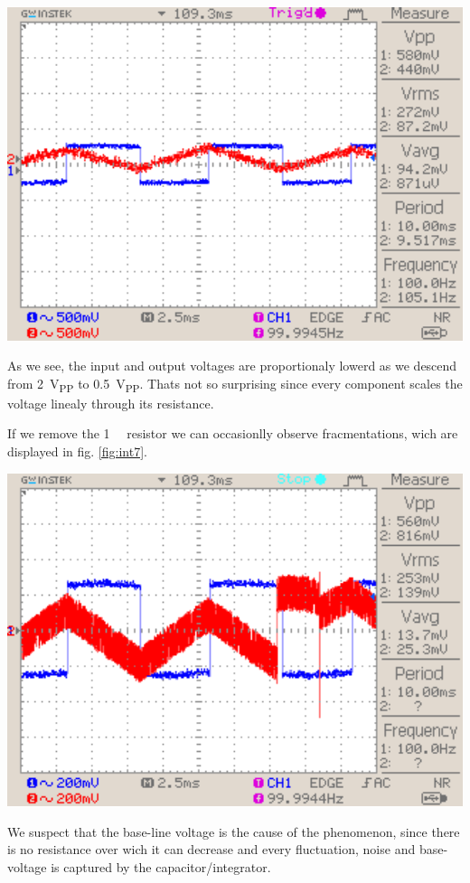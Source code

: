 \documentclass[a4paper,10pt]{article}
\newenvironment{Figure}
        {\par\medskip\noindent\minipage{\linewidth}}
        {\endminipage\par\medskip}
\numberwithin{equation}{section}
\begin{document}
\begin{multicols}{2}
\begin{Figure}
		\includegraphics[width=1\textwidth]{../data/DS0037_n.png}
		\label{fig:int6}
	\end{Figure}
  As we see, the input and output voltages are proportionaly lowerd as we descend from \SI{2}{V_{PP}} to \SI{0.5}{V_{PP}}. Thats not so surprising since every component scales the voltage linealy through its resistance.

  If we remove the \SI{1}{\mega \Omega} resistor we can occasionlly observe fracmentations, wich are displayed in fig. \ref{fig:int7}.
	\begin{Figure}
		\centering
		\includegraphics[width=1\textwidth]{../data/DS0038_n.png}
		\label{fig:int7}
	\end{Figure}
  We suspect that the base-line voltage is the cause of the phenomenon, since there is no resistance over wich it can decrease and every fluctuation, noise and base-voltage is captured by the capacitor/integrator.


\end{multicols}
\end{document}
